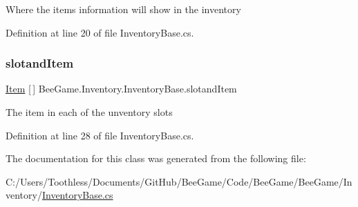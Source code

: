Where the item\textquotesingle{}s information will show in the inventory 



Definition at line 20 of file Inventory\+Base.\+cs.

\mbox{\label{class_bee_game_1_1_inventory_1_1_inventory_base_a405502a6eabf14e1498d96dc8aff5e8d}} 
\subsubsection{\texorpdfstring{slotand\+Item}{slotandItem}}
{\footnotesize\ttfamily \hyperlink{struct_bee_game_1_1_items_1_1_item}{Item} \mbox{[}$\,$\mbox{]} Bee\+Game.\+Inventory.\+Inventory\+Base.\+slotand\+Item}



The item in each of the unventory slots 



Definition at line 28 of file Inventory\+Base.\+cs.



The documentation for this class was generated from the following file\+:\begin{DoxyCompactItemize}
\item 
C\+:/\+Users/\+Toothless/\+Documents/\+Git\+Hub/\+Bee\+Game/\+Code/\+Bee\+Game/\+Bee\+Game/\+Inventory/\hyperlink{_inventory_base_8cs}{Inventory\+Base.\+cs}\end{DoxyCompactItemize}
